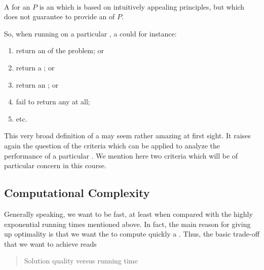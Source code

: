 \paragraph{}
\begin{definition}[Heuristic]
A  for an  $P$ is an  which is based on intuitively appealing principles, but which does not guarantee to provide an  of $P$.
\end{definition}

So, when running on a particular , a  could for instance:
\begin{enumerate}
 \item return an  of the problem; or
 \item return a ; or
 \item return an ; or
 \item fail to return any  at all;
 \item etc.
\end{enumerate}
This very broad definition of a  may seem rather amazing at first sight. It raises again the question of the criteria which can be applied to analyze the performance of a particular . We mention here two criteria which will be of particular concern in this course.

\subsection{Computational Complexity}
Generally speaking, we want  to be fast, at least when compared with the highly exponential running times mentioned above. In fact, the main reason for giving up optimality is that we want the  to compute quickly a . Thus, the basic trade-off that we want to achieve reads
\begin{quote}
Solution quality versus running time
\end{quote}

